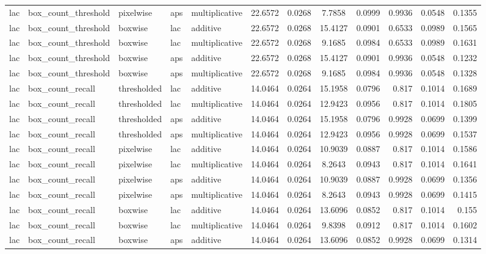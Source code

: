 \begin{table*}[htbp]
\begin{tabular}{@{}lllll rrcrrcr@{}}
lac & box\_count\_threshold & pixelwise & aps & multiplicative & 22.6572 & 0.0268 & 7.7858 & 0.0999 & 0.9936 & 0.0548 & 0.1355 \\
lac & box\_count\_threshold & boxwise & lac & additive & 22.6572 & 0.0268 & 15.4127 & 0.0901 & 0.6533 & 0.0989 & 0.1565 \\
lac & box\_count\_threshold & boxwise & lac & multiplicative & 22.6572 & 0.0268 & 9.1685 & 0.0984 & 0.6533 & 0.0989 & 0.1631 \\
lac & box\_count\_threshold & boxwise & aps & additive & 22.6572 & 0.0268 & 15.4127 & 0.0901 & 0.9936 & 0.0548 & 0.1232 \\
lac & box\_count\_threshold & boxwise & aps & multiplicative & 22.6572 & 0.0268 & 9.1685 & 0.0984 & 0.9936 & 0.0548 & 0.1328 \\
lac & box\_count\_recall & thresholded & lac & additive & 14.0464 & 0.0264 & 15.1958 & 0.0796 & 0.817 & 0.1014 & 0.1689 \\
lac & box\_count\_recall & thresholded & lac & multiplicative & 14.0464 & 0.0264 & 12.9423 & 0.0956 & 0.817 & 0.1014 & 0.1805 \\
lac & box\_count\_recall & thresholded & aps & additive & 14.0464 & 0.0264 & 15.1958 & 0.0796 & 0.9928 & 0.0699 & 0.1399 \\
lac & box\_count\_recall & thresholded & aps & multiplicative & 14.0464 & 0.0264 & 12.9423 & 0.0956 & 0.9928 & 0.0699 & 0.1537 \\
lac & box\_count\_recall & pixelwise & lac & additive & 14.0464 & 0.0264 & 10.9039 & 0.0887 & 0.817 & 0.1014 & 0.1586 \\
lac & box\_count\_recall & pixelwise & lac & multiplicative & 14.0464 & 0.0264 & 8.2643 & 0.0943 & 0.817 & 0.1014 & 0.1641 \\
lac & box\_count\_recall & pixelwise & aps & additive & 14.0464 & 0.0264 & 10.9039 & 0.0887 & 0.9928 & 0.0699 & 0.1356 \\
lac & box\_count\_recall & pixelwise & aps & multiplicative & 14.0464 & 0.0264 & 8.2643 & 0.0943 & 0.9928 & 0.0699 & 0.1415 \\
lac & box\_count\_recall & boxwise & lac & additive & 14.0464 & 0.0264 & 13.6096 & 0.0852 & 0.817 & 0.1014 & 0.155 \\
lac & box\_count\_recall & boxwise & lac & multiplicative & 14.0464 & 0.0264 & 9.8398 & 0.0912 & 0.817 & 0.1014 & 0.1602 \\
lac & box\_count\_recall & boxwise & aps & additive & 14.0464 & 0.0264 & 13.6096 & 0.0852 & 0.9928 & 0.0699 & 0.1314 \\

\end{tabular}
\end{table*}
